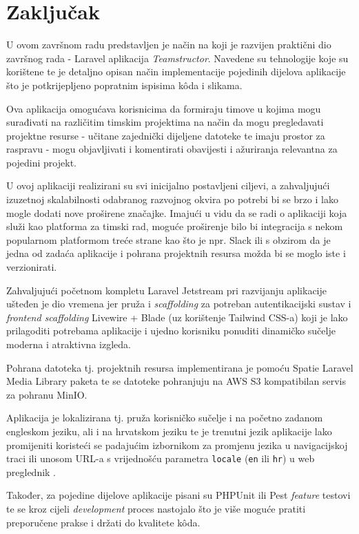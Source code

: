 \section{Zaključak}
U ovom završnom radu predstavljen je način na koji je razvijen praktični dio završnog rada - Laravel aplikacija \textit{Teamstructor}. Navedene su tehnologije koje su korištene te je detaljno opisan način implementacije pojedinih dijelova aplikacije što je potkrijepljeno popratnim ispisima k\^oda i slikama.

Ova aplikacija omogućava korisnicima da formiraju timove u kojima mogu surađivati na različitim timskim projektima na način da mogu pregledavati projektne resurse - učitane zajednički dijeljene datoteke te imaju prostor za raspravu - mogu objavljivati i komentirati obavijesti i ažuriranja relevantna za pojedini projekt. 

U ovoj aplikaciji realizirani su svi inicijalno postavljeni ciljevi, a zahvaljujući izuzetnoj skalabilnosti odabranog razvojnog okvira po potrebi bi se brzo i lako mogle dodati nove proširene značajke. Imajući u vidu da se radi o aplikaciji koja služi kao platforma za timski rad, moguće proširenje bilo bi integracija s nekom popularnom platformom treće strane kao što je npr. Slack ili s obzirom da je jedna od zadaća aplikacije i pohrana projektnih resursa možda bi se moglo iste i verzionirati.  

Zahvaljujući početnom kompletu Laravel Jetstream pri razvijanju aplikacije ušteđen je dio vremena jer pruža i \textit{scaffolding} za potreban autentikacijski sustav i \textit{frontend scaffolding} Livewire + Blade (uz korištenje Tailwind CSS-a) koji je lako prilagoditi potrebama aplikacije i ujedno korisniku ponuditi dinamičko sučelje moderna i atraktivna izgleda. 

Pohrana datoteka tj. projektnih resursa implementirana je pomoću Spatie Laravel Media Library paketa te se datoteke pohranjuju na AWS S3 kompatibilan servis za pohranu MinIO.

Aplikacija je lokalizirana tj. pruža korisničko sučelje i na početno zadanom engleskom jeziku, ali i na hrvatskom jeziku te je trenutni jezik aplikacije lako promijeniti koristeći se padajućim izbornikom za promjenu jezika u navigacijskoj traci ili unosom URL-a s vrijednošću parametra \texttt{locale} (\texttt{en} ili \texttt{hr}) u web preglednik .

Također, za pojedine dijelove aplikacije pisani su PHPUnit ili Pest \textit{feature} testovi te se kroz cijeli \textit{development} proces nastojalo što je više moguće pratiti preporučene prakse i držati do kvalitete k\^oda.
